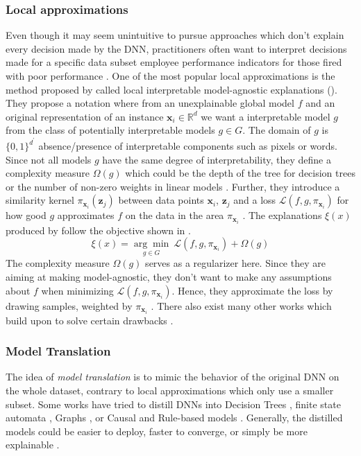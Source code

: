 \subsubsection{Local approximations}

Even though it may seem unintuitive to pursue approaches which don't explain every decision made by the DNN, practitioners often want to interpret decisions made for a specific data subset \eg employee performance indicators for those fired with poor performance \citep{xie2020explainable}. 
One of the most popular local approximations is the method proposed by \citet{Ribeiro0G16} called local interpretable model-agnostic explanations (\lime). They propose a notation where from an unexplainable global model $f$ and an original representation of an instance $\mathbf{x}_i \in \mathbb{R}^d$ we want a interpretable model $g$ from the class of potentially interpretable models $g \in G$. The domain of $g$ is $\{0,1\}^{d^{\prime}}$ \ie absence/presence of interpretable components such as pixels or words. Since not all models $g$ have the same degree of interpretability, they define a complexity measure $\Omega(g)$ which could be the depth of the tree for decision trees or the number of non-zero weights in linear models \citep{Ribeiro0G16}. Further, they introduce a similarity kernel $\pi_{\mathbf{x}_i}(\mathbf{z}_j)$ between data points $\mathbf{x}_i$,  $\mathbf{z}_j$ and a loss $\mathcal{L}(f,g,\pi_{\mathbf{x}_i})$ for how good $g$ approximates $f$ on the data in the area $\pi_{\mathbf{x}_i}$ \citep{xie2020explainable}. The explanations $\xi(x)$ produced by \lime{} follow the objective shown in .
\begin{equation}
\label{eq:lime_min}
    \xi(x)=\underset{g \in G}{\arg\min}\ \mathcal{L}\left(f, g, \pi_{\mathbf{x}_i}\right)+\Omega(g)
\end{equation}
The complexity measure $\Omega(g)$ serves as a regularizer here. Since they are aiming at making \lime{} model-agnostic, they don't want to make any assumptions about $f$ when minimizing $\mathcal{L}\left(f, g, \pi_{\mathbf{x}_i}\right)$. Hence, they approximate the loss by drawing samples, weighted by $\pi_{\mathbf{x}_i}$ \citep{Ribeiro0G16}. There also exist many other works which build upon \lime{} to solve certain drawbacks  \citep{ElenbergDFK17, Ribeiro0G18}.

\subsubsection{Model Translation}
The idea of \emph{model translation} is to mimic the behavior of the original DNN on the whole dataset, contrary to local approximations which only use a smaller subset. Some works have tried to distill DNNs into Decision Trees \citep{FrosstH17, tan2018learning, ZhangYMW19}, finite state automata \citep{HouZ20}, Graphs \citep{ZhangCWZ17, ZhangCSWZ18, ZhangYMW19}, or Causal and Rule-based models \citep{harradon2018causal, MurdochS17}. Generally, the distilled models could be easier to deploy, faster to converge, or simply be more explainable \citep{xie2020explainable}.

